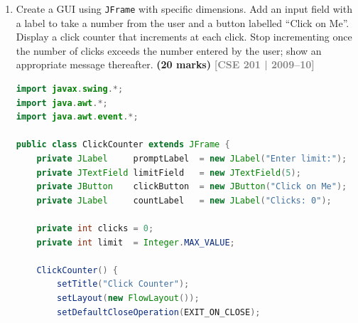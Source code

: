 \documentclass[12pt,a3paper]{article}
\newcommand{\yr}[1]{\hfill\textcolor{gray}{\small\textbf{[#1]}}}
\newcommand{\mk}[1]{\textcolor{orange!70!black}{\small\textbf{(#1 marks)}}}
\begin{document}
\begin{enumerate}
\begin{tcolorbox}[enhanced,breakable,ansbox,
  colback=cC!4,colframe=cC,boxrule=0.8pt,arc=5pt,
  title={\textbf{Answer — Layout Managers: Names and
  Descriptions}},
  fonttitle=\bfseries\color{white},colbacktitle=cC]
\begin{enumerate}[label=\textbf{\arabic*.}, itemsep=6pt]
  \item \textbf{GridLayout} --- arranges components
  in a regular grid of equal-sized cells; components
  fill cells row by row.

\begin{center}
\end{center}

\end{enumerate}

\end{tcolorbox}


\item Create a GUI using \texttt{JFrame} with specific dimensions. Add an input field with a label to take a number from the user and a button labelled ``Click on Me''. Display a click counter that increments at each click. Stop incrementing once the number of clicks exceeds the number entered by the user; show an appropriate message thereafter. \mk{20}
\yr{CSE 201 | 2009--10}

\begin{tcolorbox}[enhanced,breakable,ansbox,
  colback=cC!4,colframe=cC,boxrule=0.8pt,arc=5pt,
  title={\textbf{Answer — JFrame Click Counter with
  User-Defined Limit}},
  fonttitle=\bfseries\color{white},colbacktitle=cC]

\begin{lstlisting}[language=Java]
import javax.swing.*;
import java.awt.*;
import java.awt.event.*;

public class ClickCounter extends JFrame {
    private JLabel     promptLabel  = new JLabel("Enter limit:");
    private JTextField limitField   = new JTextField(5);
    private JButton    clickButton  = new JButton("Click on Me");
    private JLabel     countLabel   = new JLabel("Clicks: 0");

    private int clicks = 0;
    private int limit  = Integer.MAX_VALUE;

    ClickCounter() {
        setTitle("Click Counter");
        setLayout(new FlowLayout());
        setDefaultCloseOperation(EXIT_ON_CLOSE);


\end{lstlisting}
\end{tcolorbox}
\end{enumerate}
\end{document}
